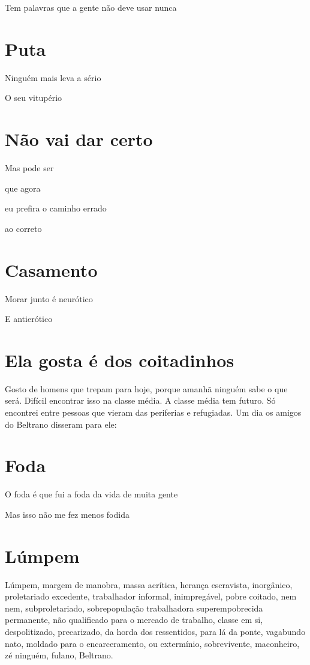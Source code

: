 Tem palavras que a gente não deve usar nunca

\chapter{Puta}

{\parindent0pt
Ninguém mais leva a sério

O seu vitupério
}

\chapter{Não vai dar certo}

{\parindent0pt
Mas pode ser

que agora

eu prefira o caminho errado

ao correto
}

\chapter{Casamento}

{\parindent0pt
Morar junto é neurótico

E antierótico
}

\chapter{Ela gosta é dos coitadinhos}

Gosto de homens que trepam para hoje, porque amanhã ninguém sabe o que
será. Difícil encontrar isso na classe média. A classe média tem futuro.
Só encontrei entre pessoas que vieram das periferias e refugiadas. Um
dia os amigos do Beltrano disseram para ele:

\chapter{Foda}

{\parindent0pt
O foda é que fui a foda da vida de muita gente

Mas isso não me fez menos fodida
}

\chapter{Lúmpem}

Lúmpem, margem de manobra, massa acrítica, herança escravista,
inorgânico, proletariado excedente, trabalhador informal, inimpregável,
pobre coitado, nem nem, subproletariado, sobrepopulação trabalhadora
superempobrecida permanente, não qualificado para o mercado de trabalho,
classe em si, despolitizado, precarizado, da horda dos ressentidos, para
lá da ponte, vagabundo nato, moldado para o encarceramento, ou
extermínio, sobrevivente, maconheiro, zé ninguém, fulano, Beltrano.


